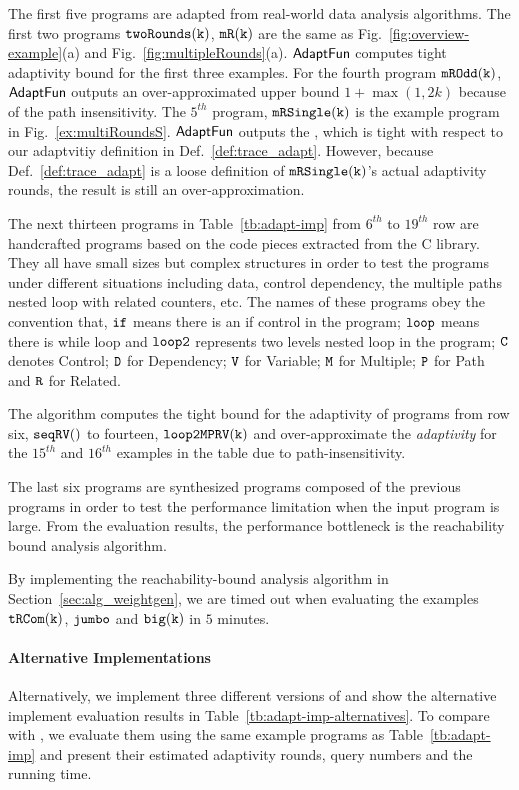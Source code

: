The first five programs are adapted from real-world data analysis algorithms.
The first two programs $\mathtt{twoRounds(k)}$, $ \mathtt{mR(k)}$ are the same as Fig.~\ref{fig:overview-example}(a) and Fig.~\ref{fig:multipleRounds}(a).
$\textsf{AdaptFun}$ computes tight adaptivity bound for the first three examples.
For the fourth program $\mathtt{mROdd(k)}$, $\textsf{AdaptFun}$ outputs an over-approximated upper bound $1 + \max(1, 2k)$ 
because of the path insensitivity. 
The $5^{th}$ program, $\mathtt{mRSingle(k)}$ is the example program in Fig.~\ref{ex:multiRoundsS}.
$\textsf{AdaptFun}$ outputs the $ $, which is tight with respect to our adaptvitiy definition in Def.~\ref{def:trace_adapt}.
However, because Def.~\ref{def:trace_adapt} is a loose definition of $\mathtt{mRSingle(k)}$'s actual adaptivity rounds,
the result is still an over-approximation.
%

The next thirteen programs in Table~\ref{tb:adapt-imp} from $6^{th}$ to $19^{th}$ row are handcrafted programs based on the code pieces extracted from the C library. They all have small sizes but complex structures in order to test the programs under different situations including
data, control dependency,
the multiple paths nested loop with related counters, etc.
The names of these programs obey the convention that,
$\mathtt{if}$ means there is an if control in the program;
$\mathtt{loop}$ means there is while loop and $\mathtt{loop2}$ represents two levels nested loop in the program;
$\mathtt{C}$ denotes Control;
$\mathtt{D}$ for Dependency; $\mathtt{V}$ for Variable;
$\mathtt{M}$ for Multiple; $\mathtt{P}$ for Path and $\mathtt{R}$ for Related.


The algorithm computes the tight bound for the adaptivity of programs from row six, $\mathtt{seqRV()}$ to fourteen, $\mathtt{loop2MPRV(k)}$
and over-approximate the \emph{adaptivity} for the $15^{th}$ and $16^{th}$ examples in the table due to path-insensitivity.

The last six programs are synthesized programs composed of the previous programs in order to test the performance limitation when the input program is large. 
From the evaluation results, the performance bottleneck is the reachability bound analysis algorithm.


By implementing the reachability-bound analysis algorithm in Section~\ref{sec:alg_weightgen}, we are timed out when evaluating the examples $\mathtt{tRCom(k)}$,  $\mathtt{jumbo}$ and ${\mathtt{big(k)}} $ in $5$ minutes.

\paragraph{Alternative Implementations}

Alternatively, we implement three different versions of {\THESYSTEM} and show the alternative implement evaluation results in Table~\ref{tb:adapt-imp-alternatives}. To compare with {\THESYSTEM},
we
evaluate them using the same example programs as Table~\ref{tb:adapt-imp} and present
their estimated adaptivity rounds, query numbers and the running time.

